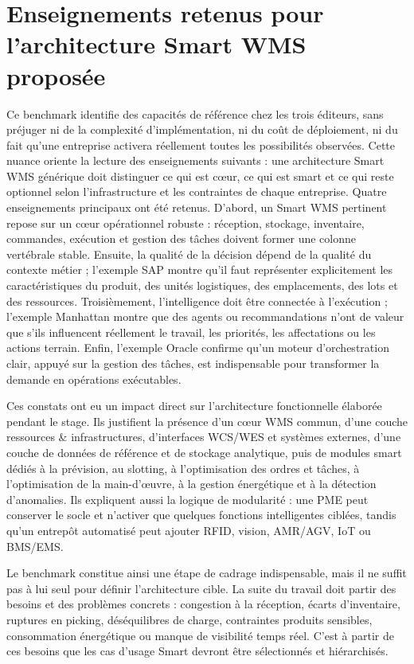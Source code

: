 \section{Enseignements retenus pour l’architecture Smart WMS proposée}

\label{sec:2.8}

Ce benchmark identifie des capacités de référence chez les trois éditeurs, sans préjuger ni de la complexité d’implémentation, ni du coût de déploiement, ni du fait qu’une entreprise activera réellement toutes les possibilités observées. Cette nuance oriente la lecture des enseignements suivants : une architecture Smart WMS générique doit distinguer ce qui est cœur, ce qui est smart et ce qui reste optionnel selon l’infrastructure et les contraintes de chaque entreprise. Quatre enseignements principaux ont été retenus. D’abord, un Smart WMS pertinent repose sur un cœur opérationnel robuste : réception, stockage, inventaire, commandes, exécution et gestion des tâches doivent former une colonne vertébrale stable. Ensuite, la qualité de la décision dépend de la qualité du contexte métier ; l’exemple SAP montre qu’il faut représenter explicitement les caractéristiques du produit, des unités logistiques, des emplacements, des lots et des ressources. Troisièmement, l’intelligence doit être connectée à l’exécution ; l’exemple Manhattan montre que des agents ou recommandations n’ont de valeur que s’ils influencent réellement le travail, les priorités, les affectations ou les actions terrain. Enfin, l’exemple Oracle confirme qu’un moteur d’orchestration clair, appuyé sur la gestion des tâches, est indispensable pour transformer la demande en opérations exécutables.


Ces constats ont eu un impact direct sur l’architecture fonctionnelle élaborée pendant le stage. Ils justifient la présence d’un cœur WMS commun, d’une couche ressources \& infrastructures, d’interfaces WCS/WES et systèmes externes, d’une couche de données de référence et de stockage analytique, puis de modules smart dédiés à la prévision, au slotting, à l’optimisation des ordres et tâches, à l’optimisation de la main-d’œuvre, à la gestion énergétique et à la détection d’anomalies. Ils expliquent aussi la logique de modularité : une PME peut conserver le socle et n’activer que quelques fonctions intelligentes ciblées, tandis qu’un entrepôt automatisé peut ajouter RFID, vision, AMR/AGV, IoT ou BMS/EMS.


Le benchmark constitue ainsi une étape de cadrage indispensable, mais il ne suffit pas à lui seul pour définir l’architecture cible. La suite du travail doit partir des besoins et des problèmes concrets : congestion à la réception, écarts d’inventaire, ruptures en picking, déséquilibres de charge, contraintes produits sensibles, consommation énergétique ou manque de visibilité temps réel. C’est à partir de ces besoins que les cas d’usage Smart devront être sélectionnés et hiérarchisés.

